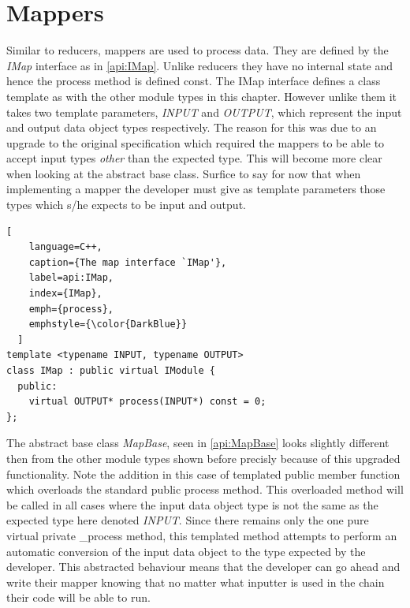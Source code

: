 \section{Mappers}\label{api:section:Mappers}

Similar to reducers, mappers are used to process data. They are defined by the \emph{IMap} interface as in \ref{api:IMap}. Unlike reducers they have no internal state and hence the process method is defined const. The IMap interface defines a class template as with the other module types in this chapter. However unlike them it takes two template parameters, \emph{INPUT} and \emph{OUTPUT}, which represent the input and output data object types respectively. The reason for this was due to an upgrade to the original specification which required the mappers to be able to accept input types \emph{other} than the expected type. This will become more clear when looking at the abstract base class. Surfice to say for now that when implementing a mapper the developer must give as template parameters those types which s/he expects to be input and output.
\begin{lstlisting}[
    language=C++,
    caption={The map interface `IMap'},
    label=api:IMap, 
    index={IMap},
    emph={process},
    emphstyle={\color{DarkBlue}}
  ]
template <typename INPUT, typename OUTPUT>
class IMap : public virtual IModule {
  public:
    virtual OUTPUT* process(INPUT*) const = 0;
};
\end{lstlisting}

The abstract base class \emph{MapBase}, seen in \ref{api:MapBase} looks slightly different then from the other module types shown before precisly because of this upgraded functionality. Note the addition in this case of templated public member function which overloads the standard public process method. This overloaded method will be called in all cases where the input data object type is not the same as the expected type here denoted \emph{INPUT}. Since there remains only the one pure virtual private \_process method, this templated method attempts to perform an automatic conversion of the input data object to the type expected by the developer. This abstracted behaviour means that the developer can go ahead and write their mapper knowing that no matter what inputter is used in the chain their code will be able to run.

